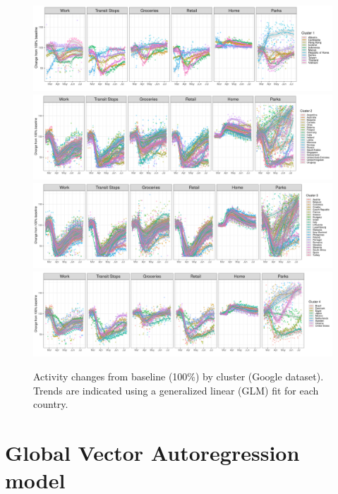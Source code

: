 \documentclass[titlepage,oneside,12pt]{article}
\newcommand{\?}{\stackrel{?}{=}}
\begin{document}
\begin{figure}[h!]
  \centering
  \includegraphics[width=\textwidth]{c1-activity}
  \includegraphics[width=\textwidth]{c2-activity}
  \includegraphics[width=\textwidth]{c3-activity}
  \includegraphics[width=\textwidth]{c4-activity}
  \caption{Activity changes from baseline (100\%) by cluster (Google dataset).  Trends are indicated using a generalized linear (GLM) fit for each country.}
  \label{fig:act}
\end{figure}





\section{Global Vector Autoregression model}
\end{document}
